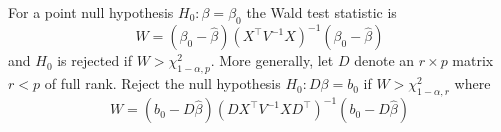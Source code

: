 \documentclass[
]{book}
\begin{document}
For a point null hypothesis \(H_0: \beta = \beta_{0}\) the Wald test statistic is
\[W = (\beta_0 - \hat\beta)(X^\top V^{-1}X)^{-1}(\beta_0 - \hat\beta)\]
and \(H_0\) is rejected if \(W > \chi^2_{1-\alpha, p}\). More generally, let \(D\) denote an \(r\times p\) matrix \(r<p\) of full rank. Reject the null hypothesis \(H_0:D\beta = b_0\) if \(W > \chi^2_{1-\alpha, r}\) where
\[W = (b_0 - D\hat\beta)(D X^\top V^{-1}X D^\top)^{-1}(b_0 - D\hat\beta)\]

  
\end{document}
